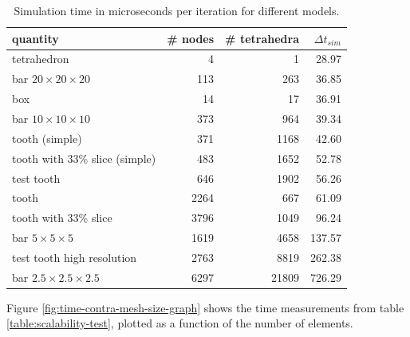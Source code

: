 \begin{table}
  \centering
  \begin{tabular}{|l|r|r|r|}
    \hline
    quantity & \# nodes & \# tetrahedra & $\Delta t_{sim}$ \\
    \hline
    tetrahedron                     &    4 &     1 &  28.97 \\
    bar $20 \times 20 \times 20$    &  113 &   263 &  36.85 \\
    box                             &   14 &    17 &  36.91 \\
    bar $10 \times 10 \times 10$    &  373 &   964 &  39.34 \\
    tooth (simple)                  &  371 &  1168 &  42.60 \\
    tooth with 33\% slice (simple)  &  483 &  1652 &  52.78 \\
    test tooth                      &  646 &  1902 &  56.26 \\
    tooth                           & 2264 &   667 &  61.09 \\
    tooth with 33\% slice           & 3796 &  1049 &  96.24 \\
    bar $5 \times 5 \times 5$       & 1619 &  4658 & 137.57 \\
    test tooth high resolution      & 2763 &  8819 & 262.38 \\
    bar $2.5 \times 2.5 \times 2.5$ & 6297 & 21809 & 726.29 \\
    \hline
  \end{tabular}
  \caption{Simulation time in microseconds per iteration for different models.}
  \label{table:scalability-test}
\end{table}


%
Figure \vref{fig:time-contra-mesh-size-graph} shows the time
measurements from table \vref{table:scalability-test}, plotted as a
function of the number of elements. 

